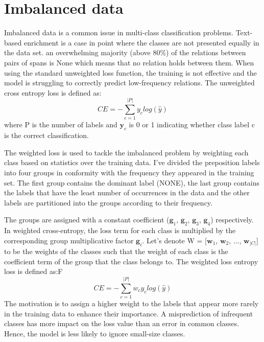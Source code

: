 \documentclass[11pt, a4paper, twocolumn]{article}
\begin{document}
\section{Imbalanced data}
\label{imbalanced}

Imbalanced data is a common issue in multi-class classification problems. Text-based enrichment is a case in point where the classes are not presented equally in the data set. an overwhelming majority (above 80\%) of the relations between pairs of spans is None which means that no relation holds between them.
When using the standard unweighted loss function, the training is not effective and the model is struggling to correctly predict low-frequency relations.
The unweighted cross entropy loss is defined as:
\begin{equation} \label{eq:01}
    CE = -\sum_{c=1}^{|P|} y_clog(\hat{y})
\end{equation}
where P is the number of labels and $\mathbf{y}_c$ is 0 or 1 indicating whether class label c is the correct classification.  

The weighted loss is used to tackle the imbalanced problem by weighting each class based on statistics over the training data. I've divided the preposition labels into four groups in conformity with the frequency they appeared in the training set. The first group contains the dominant label (NONE), the last group contains the labels that have the least number of occurrences in the data and the other labels are partitioned into the groups according to their frequency.

The groups are assigned with a constant coefficient ($\mathbf{g}_1$, $\mathbf{g}_2$, $\mathbf{g}_3$, $\mathbf{g}_4$) respectively.
In weighted cross-entropy, the loss term for each class is multiplied by the corresponding group multiplicative factor $\mathbf{g}_i$. 
Let's denote W = [$\mathbf{w}_1$, $\mathbf{w}_2$, ..., $\mathbf{w}_{|C|}$] to be the weights of the classes such that the weight of each class is the coefficient term of the group that the class belongs to.
The weighted loss entropy loss is defined as:F
\begin{equation} \label{eq:02}
    CE = -\sum_{c=1}^{|P|}w_c y_c log(\hat{y})
\end{equation}
The motivation is to assign a higher weight to the labels that appear more rarely in the training data to enhance their importance. A misprediction of infrequent classes has more impact on the loss value than an error in common classes.
Hence, the model is less likely to ignore small-size classes.
\end{document}
